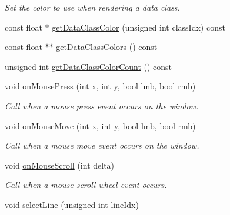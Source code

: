 \begin{DoxyCompactItemize}
\begin{DoxyCompactList}\small\item\em Set the color to use when rendering a data class. \end{DoxyCompactList}\item 
const float $\ast$ \hyperlink{class_lots_of_lines_1_1_rendering_system_a5e5db48a119dc6356001b78b921698d8}{get\+Data\+Class\+Color} (unsigned int class\+Idx) const 
\item 
const float $\ast$$\ast$ \hyperlink{class_lots_of_lines_1_1_rendering_system_a5e8c09e5773e0a1ff9d3693333e7d7e8}{get\+Data\+Class\+Colors} () const 
\item 
unsigned int \hyperlink{class_lots_of_lines_1_1_rendering_system_a2dcc443e681b9fa7a75bf1fbcd40b474}{get\+Data\+Class\+Color\+Count} () const 
\item 
void \hyperlink{class_lots_of_lines_1_1_rendering_system_aebbe9330430f5d43cd8eba0477c81437}{on\+Mouse\+Press} (int x, int y, bool lmb, bool rmb)\hypertarget{class_lots_of_lines_1_1_rendering_system_aebbe9330430f5d43cd8eba0477c81437}{}\label{class_lots_of_lines_1_1_rendering_system_aebbe9330430f5d43cd8eba0477c81437}

\begin{DoxyCompactList}\small\item\em Call when a mouse press event occurs on the window. \end{DoxyCompactList}\item 
void \hyperlink{class_lots_of_lines_1_1_rendering_system_a27e7ee61ae688282d34f5db4cd459b9c}{on\+Mouse\+Move} (int x, int y, bool lmb, bool rmb)\hypertarget{class_lots_of_lines_1_1_rendering_system_a27e7ee61ae688282d34f5db4cd459b9c}{}\label{class_lots_of_lines_1_1_rendering_system_a27e7ee61ae688282d34f5db4cd459b9c}

\begin{DoxyCompactList}\small\item\em Call when a mouse move event occurs on the window. \end{DoxyCompactList}\item 
void \hyperlink{class_lots_of_lines_1_1_rendering_system_a1117104c07e5290eac92643e81a7fb7b}{on\+Mouse\+Scroll} (int delta)
\begin{DoxyCompactList}\small\item\em Call when a mouse scroll wheel event occurs. \end{DoxyCompactList}\item 
void \hyperlink{class_lots_of_lines_1_1_rendering_system_a236e9b473df9bac1a87cd1ab647eec87}{select\+Line} (unsigned int line\+Idx)\hypertarget{class_lots_of_lines_1_1_rendering_system_a236e9b473df9bac1a87cd1ab647eec87}{}\label{class_lots_of_lines_1_1_rendering_system_a236e9b473df9bac1a87cd1ab647eec87}


\end{DoxyCompactItemize}
